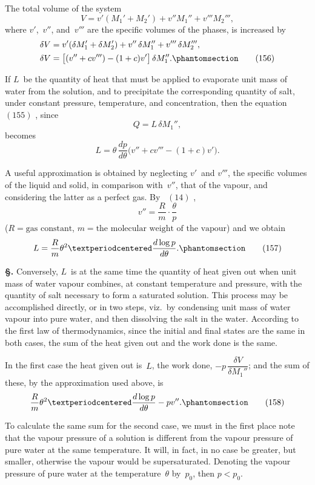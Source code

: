 \documentclass[12pt]{book}[2005/09/16]
\newcommand{\Chg}[2]{#2}
\newcommand{\Add}[1]{\Chg{}{#1}}
\newcommand{\Section}[1]{
  \medskip\par\textbf{§\;#1}
  \label{section:#1}
}
\newcommand{\Tag}[1]{%
  \phantomsection\label{eqn:#1}\tag*{\ensuremath{#1}}%
}
\newcommand{\Eq}[1]{%
  \hyperref[eqn:#1]{\ensuremath{#1}}%
}
\newcommand{\PageSep}[1]{\ignorespaces}
\begin{document}
The total volume of the system
\[
V = v' (M_{1}' + M_{2}') + v'' M_{1}'' + v''' M_{2}''',
\]
where $v'$,~$v''$, and~$v'''$ are the specific volumes of the phases,
is increased by
\begin{align*}
\delta V &= v' (\delta M_{1}' + \delta M_{2}') + v''\, \delta M_{1}'' + v'''\, \delta M_{2}'''\Add{,} \\
\delta V &= \bigl[(v'' + cv''') - (1 + c) v'\bigr]\, \delta M_{1}''.
\Tag{(156)}
\end{align*}

If $L$~be the quantity of heat that must be applied to
evaporate unit mass of water from the solution, and to precipitate
the corresponding quantity of salt, under constant
pressure, temperature, and concentration, then the equation~\Eq{(155)},
since
\[
Q = L\, \delta M_{1}'',
\]
becomes
\[
L = \theta\, \frac{dp}{d\theta} \bigl(v'' + cv''' - (1 + c)v'\bigr).
\]

A useful approximation is obtained by neglecting $v'$~and
$v'''$, the specific volumes of the liquid and solid, in comparison
with~$v''$, that of the vapour, and considering the
latter as a perfect gas. By~\Eq{(14)},
\[
v'' = \frac{R}{m} · \frac{\theta}{p}
\]
($R = \text{gas constant}$, $m = \text{the molecular weight of the vapour}$)
and we obtain
\[
L = \frac{R}{m} \theta^{2} · \frac{d \log p}{d\theta}.
\Tag{(157)}
\]

\Section{215.} Conversely, $L$~is at the same time the quantity of
heat given out when unit mass of water vapour combines, at
constant temperature and pressure, with the quantity of salt
necessary to form a saturated solution. This process may
be accomplished directly, or in two steps, viz.\ by condensing
unit mass of water vapour into pure water, and then dissolving
the salt in the water. According to the first law of
thermodynamics, since the initial and final states are the
%
\PageSep{190}
same in both cases, the sum of the heat given out and the
%
work done is the same.

In the first case the heat given out is~$L$, the work done,
$-p\, \dfrac{\delta V}{\delta M_{1}''}$; and the sum of these, by the approximation used
above, is
\[
\frac{R}{m} \theta^{2} · \frac{d \log p}{d\theta} - pv''.
\Tag{(158)}
\]

To calculate the same sum for the second case, we must
in the first place note that the vapour pressure of a solution
%
is different from the vapour pressure of pure water at the
same temperature. It will, in fact, in no case be greater,
but smaller, otherwise the vapour would be supersaturated.
Denoting the vapour pressure of pure water at the temperature~$\theta$
by~$p_{0}$, then $p < p_{0}$.
\end{document}
